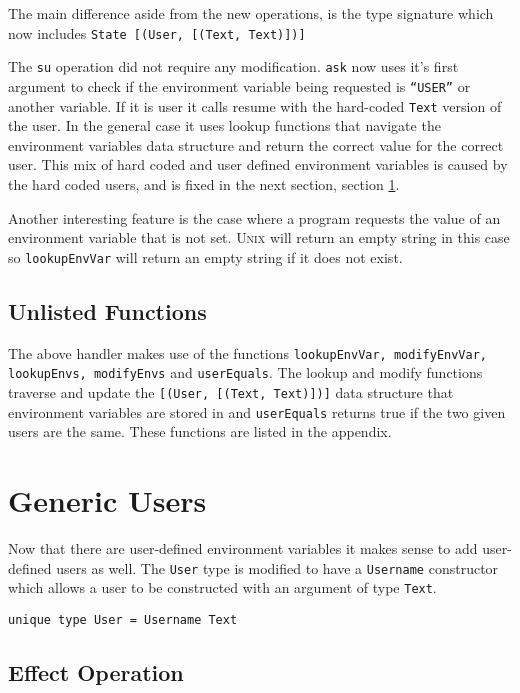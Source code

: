 \documentclass[logo,bsc,singlespacing,parskip]{infthesis}
\begin{document}
The main difference aside from the new operations, is the type signature which now includes \texttt{{State [(User, [(Text, Text)])]}}

The \texttt{su} operation did not require any modification. \texttt{ask} now
uses it's first argument to check if the environment variable being requested
is \texttt{``USER''} or another variable. If it is user it calls resume with
the hard-coded \texttt{Text} version of the user.  In the general case it uses
lookup functions that navigate the environment variables data structure and
return the correct value for the correct user. This mix of hard coded and user
defined environment variables is caused by the hard coded users, and is fixed
in the next section, section \ref{genericusers}.

Another interesting feature is the case where a program requests the value of
an environment variable that is not set. \textsc{Unix} will return an empty
string in this case so \texttt{lookupEnvVar} will return an empty string if it
does not exist.

\subsection{Unlisted Functions}

The above handler makes use of the functions \texttt{lookupEnvVar,
modifyEnvVar, lookupEnvs, modifyEnvs} and \texttt{userEquals}. The lookup and
modify functions traverse and update the \texttt{[(User, [(Text, Text)])]} data
structure that environment variables are stored in and \texttt{userEquals}
returns true if the two given users are the same. These functions are listed in
the appendix.

\section{Generic Users}
\label{genericusers}

Now that there are user-defined environment variables it makes sense to add
user-defined users as well. The \texttt{User} type is modified to have a
\texttt{Username} constructor which allows a user to be constructed with an
argument of type \texttt{Text}.

\begin{lstlisting}[language=unison]
unique type User = Username Text
\end{lstlisting}

\subsection{Effect Operation}
\end{document}
